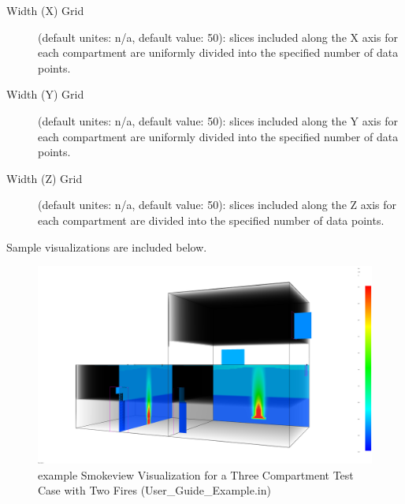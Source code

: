 \begin{description}
\item[Width (X) Grid] (default unites: n/a, default value: 50): slices included along the X axis for each compartment are uniformly divided into the specified number of data points.

\item[Width (Y) Grid] (default unites: n/a, default value: 50): slices included along the Y axis for each compartment are uniformly divided into the specified number of data points.

\item[Width (Z) Grid] (default unites: n/a, default value: 50): slices included along the Z axis for each compartment are divided into the specified number of data points.
\end{description}

Sample visualizations are included below.

\begin{figure}[h!]
\begin{center}
\includegraphics[width=6.5in]{FIGURES/SMV_Sample}
\caption{example Smokeview Visualization for a Three Compartment Test Case with Two Fires (\ct User\_Guide\_Example.in)}
\end{center}
\end{figure}


